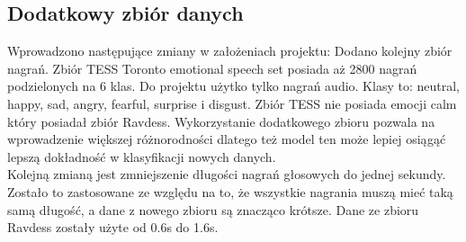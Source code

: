 \documentclass[12pt,titlepage]{article}
\begin{document}
\subsection{Dodatkowy zbiór danych}
Wprowadzono następujące zmiany w założeniach projektu:
Dodano kolejny zbiór nagrań. Zbiór TESS  Toronto emotional speech set posiada aż 2800 nagrań podzielonych na 6 klas.  Do projektu użytko tylko nagrań audio. Klasy to: neutral, happy, sad, angry, fearful, surprise i disgust. Zbiór TESS nie posiada emocji calm który posiadał zbiór Ravdess. Wykorzystanie dodatkowego zbioru pozwala na wprowadzenie większej różnorodności dlatego też model ten może lepiej osiągąć lepszą dokładność w klasyfikacji nowych danych.\\
Kolejną zmianą jest zmniejszenie długości nagrań głosowych do jednej sekundy. Zostało to zastosowane ze względu na to, że wszystkie nagrania muszą mieć taką samą długość, a dane z nowego zbioru są znacząco krótsze. Dane ze zbioru Ravdess zostały użyte od 0.6s do 1.6s.
\end{document}
